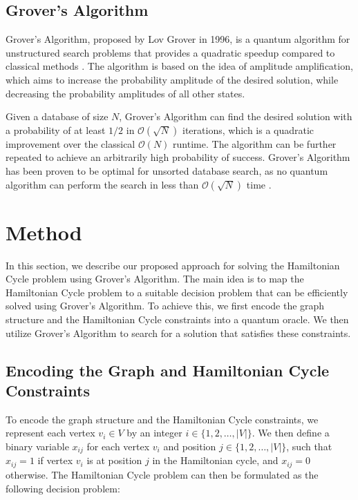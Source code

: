 \subsection{Grover's Algorithm}\label{subsec:grover}

Grover's Algorithm, proposed by Lov Grover in 1996, is a quantum algorithm for unstructured search problems that provides a quadratic speedup compared to classical methods \cite{grover1996fast}. The algorithm is based on the idea of amplitude amplification, which aims to increase the probability amplitude of the desired solution, while decreasing the probability amplitudes of all other states.

Given a database of size $N$, Grover's Algorithm can find the desired solution with a probability of at least $1/2$ in $\mathcal{O}(\sqrt{N})$ iterations, which is a quadratic improvement over the classical $\mathcal{O}(N)$ runtime. The algorithm can be further repeated to achieve an arbitrarily high probability of success. Grover's Algorithm has been proven to be optimal for unsorted database search, as no quantum algorithm can perform the search in less than $\mathcal{O}(\sqrt{N})$ time \cite{bennett1997strengths}.

\section{Method}\label{sec:method}

In this section, we describe our proposed approach for solving the Hamiltonian Cycle problem using Grover's Algorithm. The main idea is to map the Hamiltonian Cycle problem to a suitable decision problem that can be efficiently solved using Grover's Algorithm. To achieve this, we first encode the graph structure and the Hamiltonian Cycle constraints into a quantum oracle. We then utilize Grover's Algorithm to search for a solution that satisfies these constraints.

\subsection{Encoding the Graph and Hamiltonian Cycle Constraints}\label{subsec:encoding}

To encode the graph structure and the Hamiltonian Cycle constraints, we represent each vertex $v_i \in V$ by an integer $i \in \{1, 2, \dots, |V|\}$. We then define a binary variable $x_{ij}$ for each vertex $v_i$ and position $j \in \{1, 2, \dots, |V|\}$, such that $x_{ij} = 1$ if vertex $v_i$ is at position $j$ in the Hamiltonian cycle, and $x_{ij} = 0$ otherwise. The Hamiltonian Cycle problem can then be formulated as the following decision problem:

